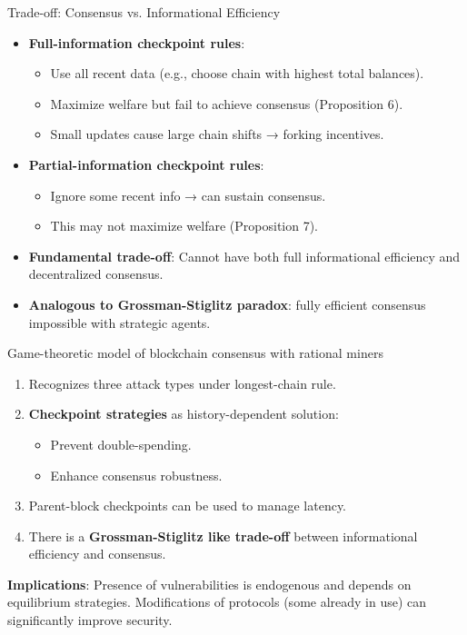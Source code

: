\documentclass[aspectratio=169, 12pt]{beamer}
\begin{document}
\begin{frame}{Trade-off: Consensus vs. Informational Efficiency}
    \begin{itemize}
        \item \textbf{Full-information checkpoint rules}:
        \begin{itemize}
            \item Use all recent data (e.g., choose chain with highest total balances).
            \item Maximize welfare but fail to achieve consensus (Proposition 6).
            \item Small updates cause large chain shifts → forking incentives.
        \end{itemize}
        \item \textbf{Partial-information checkpoint rules}:
        \begin{itemize}
            \item Ignore some recent info → can sustain consensus.
            \item This may not maximize welfare (Proposition 7).
        \end{itemize}
        \item \textbf{\alert{Fundamental trade-off}}: Cannot have both full informational efficiency and decentralized consensus.
        \item \textbf{Analogous to Grossman-Stiglitz paradox}: fully efficient consensus impossible with strategic agents.
    \end{itemize}
\end{frame}

\begin{frame}{Game-theoretic model of blockchain consensus with rational miners }
    \begin{enumerate}
        \item Recognizes three attack types under longest-chain rule.
        \item \textbf{Checkpoint strategies} as history-dependent solution:
        \begin{itemize}
            \item Prevent double-spending.
            \item Enhance consensus robustness.
        \end{itemize}
        \item Parent-block checkpoints can be used to manage latency.
        \item There is a  \textbf{Grossman-Stiglitz like trade-off}  between informational efficiency and consensus.
            \end{enumerate}
    
    \vspace{0.3cm}
    \textbf{Implications}: Presence of vulnerabilities is endogenous and  depends on equilibrium strategies. Modifications of protocols (some already in use) can significantly improve security.
\end{frame}
\end{document}
